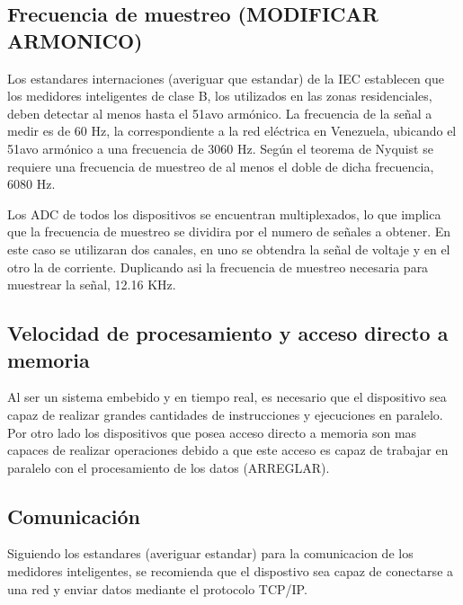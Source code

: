 \subsection{Frecuencia de muestreo (MODIFICAR ARMONICO)}
\par Los estandares internaciones (averiguar que estandar) de la IEC establecen
que los medidores inteligentes de clase B, los utilizados en las zonas residenciales,
deben detectar al menos hasta el 51avo armónico. La frecuencia de la señal a medir es de 60 Hz, la
correspondiente a la red eléctrica en Venezuela, ubicando el 51avo armónico a una frecuencia de
3060 Hz. Según el teorema de Nyquist se requiere una frecuencia de muestreo de al menos el doble
de dicha frecuencia, 6080 Hz.
\par Los ADC de todos los dispositivos se encuentran multiplexados, lo que implica que
la frecuencia de muestreo se dividira por el numero de señales a obtener. En este caso
se utilizaran dos canales, en uno se obtendra la señal de voltaje y en el otro la de
corriente. Duplicando asi la frecuencia de muestreo necesaria para muestrear la señal,
12.16 KHz.

\subsection{Velocidad de procesamiento y acceso directo a memoria}
\par Al ser un sistema embebido y en tiempo real, es necesario que el dispositivo
sea capaz de realizar grandes cantidades de instrucciones y ejecuciones en paralelo.
Por otro lado los dispositivos que posea acceso directo a memoria son mas capaces de
realizar operaciones debido a que este acceso es capaz de trabajar en paralelo con
el procesamiento de los datos (ARREGLAR).

\subsection{Comunicación}
\par Siguiendo los estandares (averiguar estandar) para la comunicacion de los
medidores inteligentes, se recomienda que el dispostivo sea capaz de conectarse a una
red y enviar datos mediante el protocolo TCP/IP. \\

